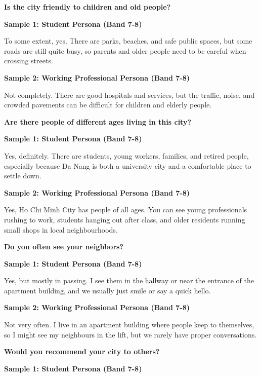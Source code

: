 \separator

\begin{ieltsquestion}
\textbf{Is the city friendly to children and old people?}
\end{ieltsquestion}
\textbf{Sample 1: Student Persona (Band 7-8)}

To some extent, yes. There are parks, beaches, and safe public spaces, but some roads are still quite busy, so parents and older people need to be careful when crossing streets.

\textbf{Sample 2: Working Professional Persona (Band 7-8)}

Not completely. There are good hospitals and services, but the traffic, noise, and crowded pavements can be difficult for children and elderly people.

\separator

\begin{ieltsquestion}
\textbf{Are there people of different ages living in this city?}
\end{ieltsquestion}
\textbf{Sample 1: Student Persona (Band 7-8)}

Yes, definitely. There are students, young workers, families, and retired people, especially because Da Nang is both a university city and a comfortable place to settle down.

\textbf{Sample 2: Working Professional Persona (Band 7-8)}

Yes, Ho Chi Minh City has people of all ages. You can see young professionals rushing to work, students hanging out after class, and older residents running small shops in local neighbourhoods.

\separator

\begin{ieltsquestion}
\textbf{Do you often see your neighbors?}
\end{ieltsquestion}
\textbf{Sample 1: Student Persona (Band 7-8)}

Yes, but mostly in passing. I see them in the hallway or near the entrance of the apartment building, and we usually just smile or say a quick hello.

\textbf{Sample 2: Working Professional Persona (Band 7-8)}

Not very often. I live in an apartment building where people keep to themselves, so I might see my neighbours in the lift, but we rarely have proper conversations.

\separator

\begin{ieltsquestion}
\textbf{Would you recommend your city to others?}
\end{ieltsquestion}
\textbf{Sample 1: Student Persona (Band 7-8)}

